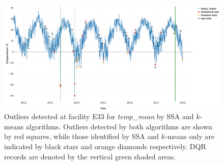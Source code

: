 \begin{figure}[ht]
    \centering
    \includegraphics[width=\textwidth]{figures/combined.png}
    \caption{Outliers detected at facility E33 for \textit{temp\_mean}
		by SSA and $k$-means algorithms. Outliers detected by both
		algorithms are shown by red squares, while those identified by
		SSA and $k$-means only are indicated by black stars and orange
		diamonds respectively. DQR records are denoted by the vertical green shaded areas.}
    \label{fig:combined}
\end{figure}


